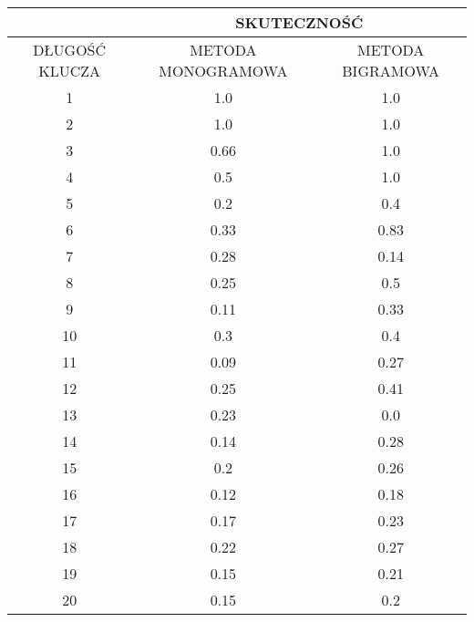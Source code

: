 \documentclass[a4paper]{article}
\begin{document}
\begin{center}\begin{tabular}{
|c|c|c|}
\hline   &\multicolumn{2}{|c|}{SKUTECZNOŚĆ} \\
\hline  DŁUGOŚĆ KLUCZA & METODA MONOGRAMOWA & METODA BIGRAMOWA\\ \hline
1
 & 1.0 & 1.0\\ \hline
2
 & 1.0 & 1.0\\ \hline
3
 & 0.66 & 1.0\\ \hline
4
 & 0.5 & 1.0\\ \hline
5
 & 0.2 & 0.4\\ \hline
6
 & 0.33 & 0.83\\ \hline
7
 & 0.28 & 0.14\\ \hline
8
 & 0.25 & 0.5\\ \hline
9
 & 0.11 & 0.33\\ \hline
10
 & 0.3 & 0.4\\ \hline
11
 & 0.09 & 0.27\\ \hline
12
 & 0.25 & 0.41\\ \hline
13
 & 0.23 & 0.0\\ \hline
14
 & 0.14 & 0.28\\ \hline
15
 & 0.2 & 0.26\\ \hline
16
 & 0.12 & 0.18\\ \hline
17
 & 0.17 & 0.23\\ \hline
18
 & 0.22 & 0.27\\ \hline
19
 & 0.15 & 0.21\\ \hline
20
 & 0.15 & 0.2\\ \hline
\end{tabular}\end{center}
\end{document}

